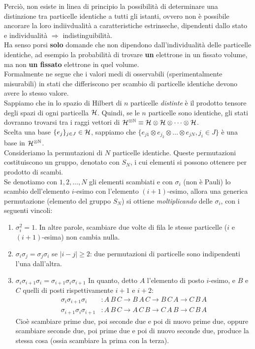 \documentclass[../../FisicaTeorica.tex]{subfiles}
\begin{document}
Perciò, non esiste in linea di principio la possibilità di determinare una distinzione tra particelle identiche a tutti gli istanti, ovvero non è possibile ancorare la loro indiivdualità a caratteristiche estrinseche, dipendenti dallo stato e individualità $\Rightarrow$ indistinguibilità.\\

Ha senso porsi \textbf{solo} domande che non dipendono dall'individualità delle particelle identiche, ad esempio la probabilità di trovare \textbf{un} elettrone in un fissato volume, ma non \textbf{un fissato} elettrone in quel volume.\\

Formalmente ne segue che i valori medi di osservabili (sperimentalmente misurabili) in stati che differiscono per scambio di particelle identiche devono avere lo stesso valore.\\
Sappiamo che in \MQ lo spazio di Hilbert di $n$ particelle \textit{distinte} è il prodotto tensore degli spazi di ogni particella $\mathcal{H}$. Quindi, se le $n$ particelle sono identiche, gli stati dovranno trovarsi tra i raggi vettori di $\mathcal{H}^{\otimes \mathbb{N}} \equiv \mathcal{H} \otimes \mathcal{H} \otimes \dots \otimes \mathcal{H}$.\\
Scelta una base $\{e_j\}_{j\in J} \in \mathcal{H}$, sappiamo che $\{e_{j1}\otimes e_{j_2} \otimes \dots \otimes e_{jN}, j_i \in J\}$ è una base in $\mathcal{H}^{\otimes \mathbb{N}}$.\\
Consideriamo la permutazioni di $N$ particelle identiche. Queste permutazioni costituiscono un gruppo, denotato con $S_N$, i cui elementi si possono ottenere per prodotto di scambi.\\
Se denotiamo con $1,2,\dots,N$ gli elementi scambiati e con $\sigma_i$ (non è Pauli) lo scambio dell'elemento $i$-esimo con l'elemento $(i+1)$-esimo, allora una generica permutazione (elemento del gruppo $S_N$) si ottiene \textit{moltiplicando} delle $\sigma_i$, con i seguenti vincoli:
\begin{enumerate}
\item $\sigma_i^2 = 1$. In altre parole, scambiare due volte di fila le stesse particelle ($i$ e $(i+1)$-esima) non cambia nulla. %
\item $\sigma_i \sigma_j = \sigma_j \sigma_i$ se $|i-j|\geq 2$: due permutazioni di particelle  sono indipendenti l'una dall'altra.
\item $\sigma_i \sigma_{i+1}\sigma_i = \sigma_{i+1}\sigma_i\sigma_{i+1}$ %
In quanto, detto $A$ l'elemento di posto $i$-esimo, e $B$ e $C$ quelli di posti rispettivamente $i+1$ e $i+2$:
\begin{align*}
\sigma_i \sigma_{i+1}\sigma_i&:A\,B\,C\to B\,A\,C \to B\,C\,A \to C\,B\,A\\
\sigma_{i+1}\sigma_i \sigma_{i+1}&:
A\,B\,C \to A\,C\,B\to C\,A\,B \to C\,B\,A 
\end{align*}
Cioè scambiare prime due, poi seconde due e poi di nuovo prime due, oppure scambiare seconde due, poi prime due e poi di nuovo seconde due, produce la stessa cosa (ossia scambiare la prima con la terza).
\end{enumerate}
\end{document}
